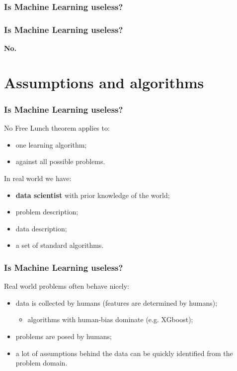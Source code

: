 \documentclass[mathserif, aspectratio=43]{beamer}
\begin{document}
\begin{frame}[fragile]
\frametitle{Is Machine Learning useless?}
\begin{center}
\phantom{\Huge No.}
\end{center}

\end{frame}


\begin{frame}[fragile]
\frametitle{Is Machine Learning useless?}
\begin{center}
\textbf{\Huge No.}
\end{center}

\end{frame}


\section{Assumptions and algorithms}



\begin{frame}[fragile]
\frametitle{Is Machine Learning useless?}
No Free Lunch theorem applies to:
\begin{itemize}
\item one learning algorithm;
\item against all possible problems.
\end{itemize}
\vspace*{5mm}
In real world we have:
\begin{itemize}
\item \textbf{data scientist} with prior knowledge of the world;
\item problem description;
\item data description;
\item a set of standard algorithms.
\end{itemize}

\end{frame}


\begin{frame}[fragile]
\frametitle{Is Machine Learning useless?}
Real world problems often behave nicely:
\begin{itemize}
\item data is collected by humans (features are determined by humans);\begin{itemize}
\item algorithms with human-bias dominate (e.g. XGboost);
\end{itemize}

\item problems are posed by humans;
\item a lot of assumptions behind the data can be quickly identified from the problem domain.
\end{itemize}

\end{frame}
\end{document}
